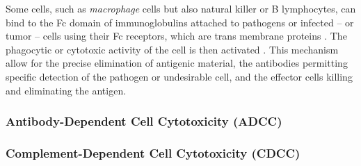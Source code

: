 Some cells, such as \emph{macrophage} cells but also natural killer or B lymphocytes, 
can bind to the Fc domain
of immunoglobulins attached to pathogens or infected -- or tumor -- cells
using their Fc receptors, which are trans membrane proteins \cite{fridman_fc_1991}. 
The phagocytic or cytotoxic activity of the cell is then activated \cite{tay_antibody-dependent_2019}.
This mechanism allow for the precise elimination of antigenic material, the antibodies
permitting specific detection of the pathogen or undesirable cell, and the effector cells
killing and eliminating the antigen.

\subsubsection{Antibody-Dependent Cell Cytotoxicity (ADCC)}

\subsubsection{Complement-Dependent Cell Cytotoxicity (CDCC)}
